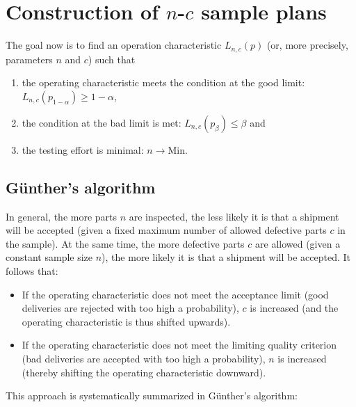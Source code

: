 \documentclass[a4paper,11pt,oneside]{article}
\begin{document}
\section[Construction of n-c sample plans]{Construction of $n$-$c$ sample plans}

The goal now is to find an operation characteristic $L_{n,c}(p)$ (or, more precisely, parameters $n$ and $c$) such that
\begin{enumerate}
\item
the operating characteristic meets the condition at the good limit:\\
$L_{n,c}(p_{1-\alpha})\ge1-\alpha$,
\item
the condition at the bad limit is met: $L_{n,c}(p_\beta)\le\beta$ and
\item
the testing effort is minimal: $n\to\mathrm{Min}$.
\end{enumerate}

\subsection{Günther's algorithm}

In general, the more parts $n$ are inspected, the less likely it is that a shipment will be accepted (given a fixed maximum number of allowed defective parts $c$ in the sample). At the same time, the more defective parts $c$ are allowed (given a constant sample size $n$), the more likely it is that a shipment will be accepted. It follows that:

\begin{itemize}
\item
If the operating characteristic does not meet the acceptance limit (good deliveries are rejected with too high a probability), $c$ is increased (and the operating characteristic is thus shifted upwards).
\item
If the operating characteristic does not meet the limiting quality criterion (bad deliveries are accepted with too high a probability), $n$ is increased (thereby shifting the operating characteristic downward).
\end{itemize}

This approach is systematically summarized in Günther's algorithm:
\end{document}
